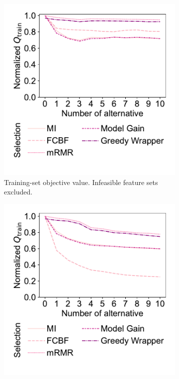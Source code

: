 \documentclass{article}
\theoremstyle{definition}
\begin{document}
\begin{figure}[p]
	\centering
	\begin{subfigure}[t]{0.48\textwidth}
		\centering
		\includegraphics[width=\textwidth, trim=20 35 15 15, clip]{plots/afs-impact-num-alternatives-fs-method-train-objective-max.pdf}
		\caption{
			Training-set objective value.
			Infeasible feature sets excluded.
		}
		\label{fig:afs:impact-num-alternatives-fs-method-train-objective-max}
	\end{subfigure}
	\hfill
	\begin{subfigure}[t]{0.48\textwidth}
		\centering
		\includegraphics[width=\textwidth, trim=20 35 15 15, clip]{plots/afs-impact-num-alternatives-fs-method-train-objective-max-fillna.pdf}

\end{subfigure}
\end{figure}
\end{document}
